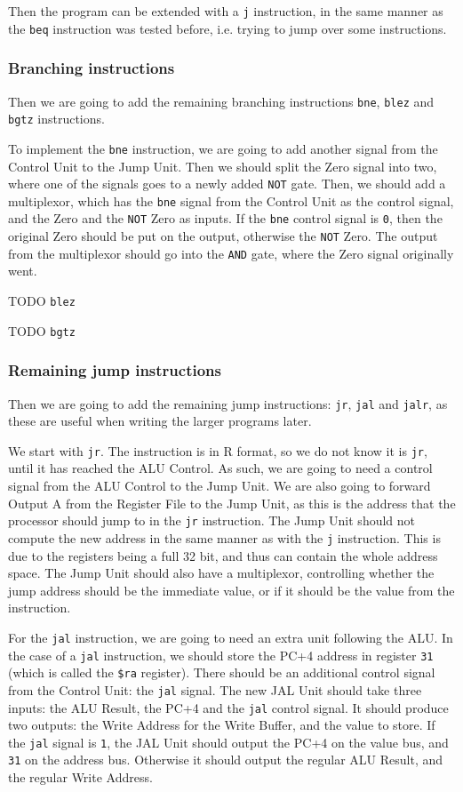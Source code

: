 Then the program can be extended with a \texttt{j} instruction, in the same
manner as the \texttt{beq} instruction was tested before, i.e. trying to jump
over some instructions.

\subsubsection*{Branching instructions}
Then we are going to add the remaining branching instructions \texttt{bne},
\texttt{blez} and \texttt{bgtz} instructions.

To implement the \texttt{bne} instruction, we are going to add another signal
from the Control Unit to the Jump Unit. Then we should split the Zero signal
into two, where one of the signals goes to a newly added \texttt{NOT} gate.
Then, we should add a multiplexor, which has the \texttt{bne} signal from the
Control Unit as the control signal, and the Zero and the \texttt{NOT} Zero as
inputs. If the \texttt{bne} control signal is \texttt{0}, then the original
Zero should be put on the output, otherwise the \texttt{NOT} Zero. The output
from the multiplexor should go into the \texttt{AND} gate, where the Zero
signal originally went.

TODO \texttt{blez}

TODO \texttt{bgtz}

\subsubsection*{Remaining jump instructions}
Then we are going to add the remaining jump instructions: \texttt{jr},
\texttt{jal} and \texttt{jalr}, as these are useful when writing the larger
programs later.

We start with \texttt{jr}. The instruction is in R format, so we do not know it
is \texttt{jr}, until it has reached the ALU Control. As such, we are going to
need a control signal from the ALU Control to the Jump Unit. We are also going
to forward Output A from the Register File to the Jump Unit, as this is the
address that the processor should jump to in the \texttt{jr} instruction. The
Jump Unit should not compute the new address in the same manner as with the
\texttt{j} instruction. This is due to the registers being a full 32 bit, and
thus can contain the whole address space. The Jump Unit should also have a
multiplexor, controlling whether the jump address should be the immediate
value, or if it should be the value from the instruction.

For the \texttt{jal} instruction, we are going to need an extra unit following
the ALU. In the case of a \texttt{jal} instruction, we should store the PC+4
address in register \texttt{31} (which is called the \texttt{\$ra} register).
There should be an additional control signal from the Control Unit: the
\texttt{jal} signal. The new JAL Unit should take three inputs: the ALU Result,
the PC+4 and the \texttt{jal} control signal. It should produce two outputs:
the Write Address for the Write Buffer, and the value to store. If the
\texttt{jal} signal is \texttt{1}, the JAL Unit should output the PC+4 on the
value bus, and \texttt{31} on the address bus. Otherwise it should output the
regular ALU Result, and the regular Write Address.

